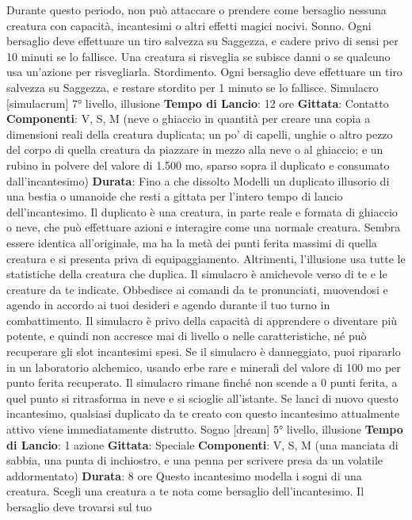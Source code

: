 \begin{multicols}{2}
Durante questo periodo, non può attaccare o prendere
come bersaglio nessuna creatura con capacità,
incantesimi o altri effetti magici nocivi.
Sonno. Ogni bersaglio deve effettuare un tiro salvezza
su Saggezza, e cadere privo di sensi per 10 minuti se lo
fallisce. Una creatura si risveglia se subisce danni o se
qualcuno usa un’azione per risvegliarla.
Stordimento. Ogni bersaglio deve effettuare un tiro
salvezza su Saggezza, e restare stordito per 1 minuto
se lo fallisce.
Simulacro
[simulacrum]
7° livello, illusione
\textbf{Tempo di Lancio}: 12 ore
\textbf{Gittata}: Contatto
\textbf{Componenti}: V, S, M (neve o ghiaccio in quantità per
creare una copia a dimensioni reali della creatura
duplicata; un po’ di capelli, unghie o altro pezzo del
corpo di quella creatura da piazzare in mezzo alla neve
o al ghiaccio; e un rubino in polvere del valore di 1.500
mo, sparso sopra il duplicato e consumato
dall’incantesimo)
\textbf{Durata}: Fino a che dissolto
Modelli un duplicato illusorio di una bestia o umanoide
che resti a gittata per l’intero tempo di lancio
dell’incantesimo. Il duplicato è una creatura, in parte
reale e formata di ghiaccio o neve, che può effettuare
azioni e interagire come una normale creatura. Sembra
essere identica all’originale, ma ha la metà dei punti
ferita massimi di quella creatura e si presenta priva di
equipaggiamento. Altrimenti, l’illusione usa tutte le
statistiche della creatura che duplica.
Il simulacro è amichevole verso di te e le creature da te
indicate. Obbedisce ai comandi da te pronunciati,
muovendosi e agendo in accordo ai tuoi desideri e
agendo durante il tuo turno in combattimento. Il
simulacro è privo della capacità di apprendere o
diventare più potente, e quindi non accresce mai di
livello o nelle caratteristiche, né può recuperare gli slot
incantesimi spesi.
Se il simulacro è danneggiato, puoi ripararlo in un
laboratorio alchemico, usando erbe rare e minerali del
valore di 100 mo per punto ferita recuperato. Il
simulacro rimane finché non scende a 0 punti ferita, a
quel punto si ritrasforma in neve e si scioglie all’istante.
Se lanci di nuovo questo incantesimo, qualsiasi
duplicato da te creato con questo incantesimo
attualmente attivo viene immediatamente distrutto.
Sogno
[dream]
5° livello, illusione
\textbf{Tempo di Lancio}: 1 azione
\textbf{Gittata}: Speciale
\textbf{Componenti}: V, S, M (una manciata di sabbia, una
punta di inchiostro, e una penna per scrivere presa da
un volatile addormentato)
\textbf{Durata}: 8 ore
Questo incantesimo modella i sogni di una creatura.
Scegli una creatura a te nota come bersaglio
dell’incantesimo. Il bersaglio deve trovarsi sul tuo

\end{multicols}
